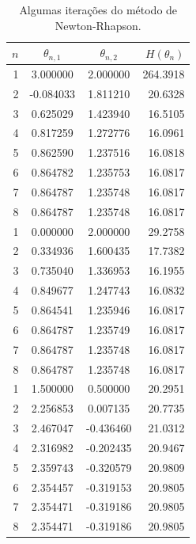 \documentclass{abnt}
\begin{document}
\begin{table}
        \begin{center}
                \begin{tabular}{ r | c c r  }
                        \hline
                        $n$ & $\theta_{n,1}$ & $\theta_{n,2}$ & $H(\theta_n)$ \\
                        \hline
                        1 & 3.000000 & 2.000000 & 264.3918 \\
                        2 & -0.084033 & 1.811210 & 20.6328 \\
                        3 & 0.625029 & 1.423940 & 16.5105 \\
                        4 & 0.817259 & 1.272776 & 16.0961 \\
                        5 & 0.862590 & 1.237516 & 16.0818 \\
                        6 & 0.864782 & 1.235753 & 16.0817 \\
                        7 & 0.864787 & 1.235748 & 16.0817 \\
                        8 & 0.864787 & 1.235748 & 16.0817 \\
                        \hline
                        1 & 0.000000 & 2.000000 & 29.2758 \\
                        2 & 0.334936 & 1.600435 & 17.7382 \\
                        3 & 0.735040 & 1.336953 & 16.1955 \\
                        4 & 0.849677 & 1.247743 & 16.0832 \\
                        5 & 0.864541 & 1.235946 & 16.0817 \\
                        6 & 0.864787 & 1.235749 & 16.0817 \\
                        7 & 0.864787 & 1.235748 & 16.0817 \\
                        8 & 0.864787 & 1.235748 & 16.0817 \\
                        \hline
                        1 & 1.500000 & 0.500000 & 20.2951 \\
                        2 & 2.256853 & 0.007135 & 20.7735 \\
                        3 & 2.467047 & -0.436460 & 21.0312 \\
                        4 & 2.316982 & -0.202435 & 20.9467 \\
                        5 & 2.359743 & -0.320579 & 20.9809 \\
                        6 & 2.354457 & -0.319153 & 20.9805 \\
                        7 & 2.354471 & -0.319186 & 20.9805 \\
                        8 & 2.354471 & -0.319186 & 20.9805 \\
                        \hline
                \end{tabular}
        \end{center}
        \caption{Algumas iterações do método de Newton-Rhapson.}
        \label{resultados_nr}
\end{table}
\end{document}
